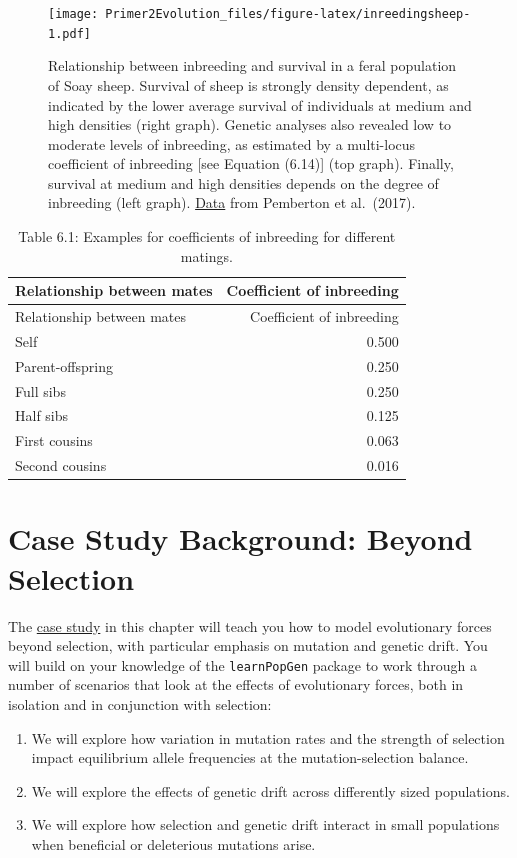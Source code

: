 \documentclass[
]{book}
\begin{document}
\begin{figure}
\centering
\texttt{[image: Primer2Evolution\_files/figure-latex/inreedingsheep-1.pdf]}
\caption{\label{fig:inreedingsheep}Relationship between inbreeding and survival in a feral population of Soay sheep. Survival of sheep is strongly density dependent, as indicated by the lower average survival of individuals at medium and high densities (right graph). Genetic analyses also revealed low to moderate levels of inbreeding, as estimated by a multi-locus coefficient of inbreeding {[}see Equation (6.14){]} (top graph). Finally, survival at medium and high densities depends on the degree of inbreeding (left graph). \href{data/6_inbreeding.csv}{Data} from Pemberton et al.~(2017).}
\end{figure}

\begin{longtable}[]{@{}lr@{}}
\caption{Table 6.1: Examples for coefficients of inbreeding for different matings.}\tabularnewline
\toprule
Relationship between mates & Coefficient of inbreeding \\
\midrule
\endfirsthead
\toprule
Relationship between mates & Coefficient of inbreeding \\
\midrule
\endhead
Self & 0.500 \\
Parent-offspring & 0.250 \\
Full sibs & 0.250 \\
Half sibs & 0.125 \\
First cousins & 0.063 \\
Second cousins & 0.016 \\
\bottomrule
\end{longtable}

\hypertarget{case-study-background-beyond-selection}{%
\section{Case Study Background: Beyond Selection}\label{case-study-background-beyond-selection}}

The \href{exercises/BIOL520-ex5.zip}{case study} in this chapter will teach you how to model evolutionary forces beyond selection, with particular emphasis on mutation and genetic drift. You will build on your knowledge of the \texttt{learnPopGen} package to work through a number of scenarios that look at the effects of evolutionary forces, both in isolation and in conjunction with selection:

\begin{enumerate}
\def\labelenumi{\arabic{enumi}.}
\item
  We will explore how variation in mutation rates and the strength of selection impact equilibrium allele frequencies at the mutation-selection balance.
\item
  We will explore the effects of genetic drift across differently sized populations.
\item
  We will explore how selection and genetic drift interact in small populations when beneficial or deleterious mutations arise.
\end{enumerate}
\end{document}

